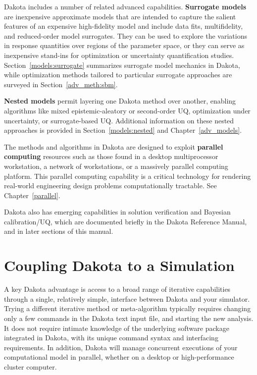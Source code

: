 Dakota includes a number of related advanced capabilities. {\bf
  Surrogate models} are inexpensive approximate models that are
intended to capture the salient features of an expensive high-fidelity
model and include data fits, multifidelity, and reduced-order model
surrogates. They can be used to explore the variations in response
quantities over regions of the parameter space, or they can serve as
inexpensive stand-ins for optimization or uncertainty quantification
studies. Section~\ref{models:surrogate} summarizes surrogate model
mechanics in Dakota, while optimization methods tailored to particular
surrogate approaches are surveyed in Section~\ref{adv_meth:sbm}.

{\bf Nested models} permit layering one Dakota method over another,
enabling algorithms like mixed epistemic-aleatory or second-order UQ,
optimization under uncertainty, or surrogate-based UQ. Additional
information on these nested approaches is provided in
Section~\ref{models:nested} and Chapter~\ref{adv_models}.

The methods and algorithms in Dakota are designed to exploit {\bf
  parallel computing} resources such as those found in a desktop
multiprocessor workstation, a network of workstations, or a massively
parallel computing platform. This parallel computing capability is a
critical technology for rendering real-world engineering design
problems computationally tractable. See Chapter~\ref{parallel}.

Dakota also has emerging capabilities in solution verification and
Bayesian calibration/UQ, which are documented briefly in the Dakota
Reference Manual, and in later sections of this manual.

\section{Coupling Dakota to a Simulation}\label{intro:coupling}

A key Dakota advantage is access to a broad range of iterative
capabilities through a single, relatively simple, interface between
Dakota and your simulator. Trying a different iterative method or
meta-algorithm typically requires changing only a few commands in the Dakota
text input file, and starting the new analysis. It does not require
intimate knowledge of the underlying software package integrated in
Dakota, with its unique command syntax and interfacing requirements.
In addition, Dakota will manage concurrent executions of your
computational model in parallel, whether on a desktop or
high-performance cluster computer.

